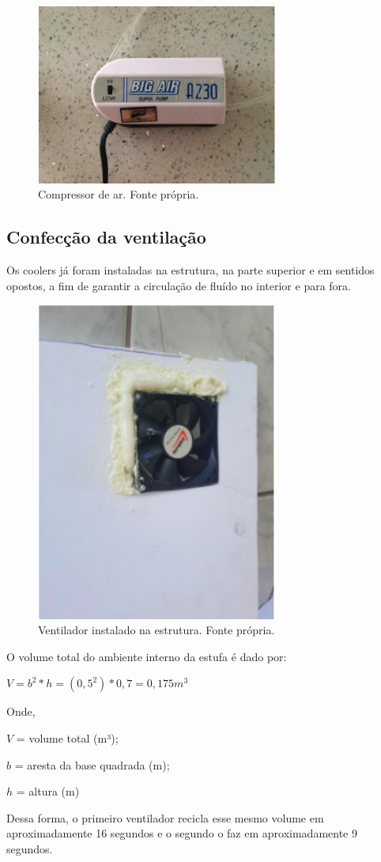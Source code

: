 \begin{figure}[H]
	\centering
	\includegraphics[width=8cm]{figuras/compressor.png}
	\caption{Compressor de ar. Fonte própria.}
	\label{compressor}
\end{figure}


\subsection{Confecção da ventilação}

Os coolers já foram instaladas na estrutura, na parte superior e em sentidos opostos, a fim de garantir a circulação de fluído no interior e para fora.

\begin{figure}[H]
	\centering
	\includegraphics[width=8cm]{figuras/ventilador.png}
	\caption{Ventilador instalado na estrutura. Fonte própria.}
	\label{ventilador}
\end{figure}

O volume total do ambiente interno da estufa é dado por:

\begin{center}
	\large
	${\displaystyle V = b^2 * h = (0,5^2) * 0,7 = 0,175 m^3}$
\end{center}

Onde,

$V$ = volume total (m³);

$b$ = aresta da base quadrada (m);

$h$ = altura (m)

Dessa forma, o primeiro ventilador recicla esse mesmo volume em aproximadamente 16 segundos e o segundo o faz em aproximadamente 9 segundos.  

